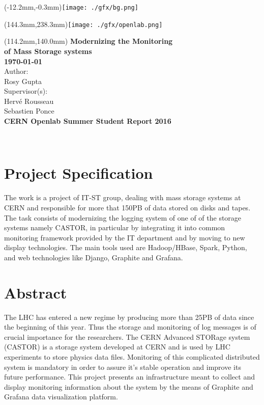 \documentclass[11pt, letterpaper]{article}            %
\begin{document}
\begin{textblock*}{0mm}(-12.2mm,-0.3mm)\noindent \texttt{[image: ./gfx/bg.png]}\end{textblock*}
\begin{textblock*}{0mm}(144.3mm,238.3mm)\noindent \texttt{[image: ./gfx/openlab.png]}\end{textblock*}
\begin{textblock*}{150mm}(114.2mm,140.0mm)\noindent
{\bfseries\sffamily\textbf{\fontsize{20}{20}\selectfont\color{natc}Modernizing the Monitoring\\
of Mass Storage systems}}\\[36pt]
{\bfseries\sffamily\textbf{\fontsize{16}{20}\selectfont\color{natc}\motd\today}}\\[14pt]
{\sffamily\fontsize{14}{20}\selectfont\color{subc}Author:}\\
{\sffamily\fontsize{14}{20}\selectfont\color{subc}Rosy Gupta}\\[18pt]
{\sffamily\fontsize{14}{20}\selectfont\color{subc}Supervisor(s):}\\
{\sffamily\fontsize{14}{20}\selectfont\color{subc}Hervé Rousseau}\\
{\sffamily\fontsize{14}{20}\selectfont\color{subc}Sebastien Ponce}\\
[18pt]
\textbf{\bfseries\sffamily\fontsize{11}{20}\selectfont\color{subc}CERN Openlab Summer Student Report 2016}

\end{textblock*}
~
\thispagestyle{empty}\newpage

\section*{Project Specification}
The work is a project of  IT-ST group, dealing with mass storage systems at CERN and responsible for more that 150PB of data stored on disks and tapes. The task consists of modernizing the logging system of one of of the storage systems namely CASTOR, in particular by integrating it into common monitoring framework provided by the IT department and by moving to new display technologies. The main tools used are Hadoop/HBase, Spark, Python, and web technologies like Django, Graphite and Grafana.
\newpage

\section*{Abstract}
The LHC has entered a new regime by producing more than 25PB of data since the beginning of this year. Thus the storage and monitoring of log messages is of crucial importance for the researchers. The CERN Advanced STORage system (CASTOR) is a storage system developed at CERN and is used by LHC experiments to store physics data files. Monitoring of this complicated distributed system is mandatory in order to assure it’s stable operation and improve its future performance. This project presents an infrastructure meant to collect and display monitoring information about the system by the means of Graphite and Grafana data visualization platform.
\end{document}
